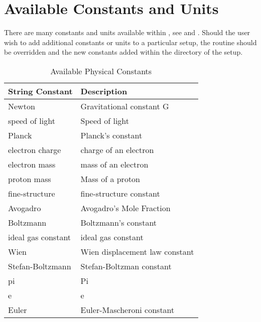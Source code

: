 \section{Available Constants and Units}
\label{sec:PhysicalConstantsAvailable}

There are many constants and units available within \flashx,
see
 and
. Should the user wish to add
additional constants or units to a particular setup, the routine
 should be
overridden and the new constants added within the directory of the setup.

\begin{table}
\caption{Available Physical Constants}
\label{Tab:PhysicalConstants}
\begin{center}
\begin{tabular}{|ll|} \hline
{\bf String Constant} & {\bf Description} \\ \hline 
        Newton &      Gravitational constant G \\
        speed of light &     Speed of light \\
        Planck &        Planck's constant \\
        electron charge &      charge of an electron \\
        electron mass &        mass of an electron \\
        proton mass &          Mass of a proton \\
        fine-structure &      fine-structure constant \\
        Avogadro &            Avogadro's Mole Fraction \\
        Boltzmann &            Boltzmann's constant \\
        ideal gas constant &   ideal gas constant \\
        Wien &              Wien displacement law constant \\
        Stefan-Boltzmann &  Stefan-Boltzman constant \\
        pi &          Pi \\
        e &           e \\
        Euler &  Euler-Mascheroni constant \\ \hline
\end{tabular}

\end{center}

\end{table}

